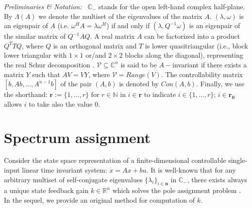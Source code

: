 \documentclass[conference]{IEEEtran}
\newcommand{\msv}{\mathcal{V}}
\newcommand{\numn}{\boldsymbol{n}}
\newcommand{\numr}{\boldsymbol{r}}
\newcommand{\kont}{\mathit{Con}}
\newcommand{\numro}{\boldsymbol{r_0}}
\begin{document}
\emph{Preliminaries \& Notation:~} $\mathbb{C}_{-}$ stands for the open
left-hand complex half-plane. By $\varLambda(A)$ we denote the
multiset of the eigenvalues of the matrix $A$. $(\lambda,\omega)$ is an eigenpair of $A$
(i.e. $\omega^HA=\lambda\omega^H$) if and only if $(\lambda,Q^{-1}\omega)$ is an
eigenpair of the similar matrix of $Q^{-1}A Q$. A real matrix $A$ can be
factorized into a product $Q^T T Q$, where $Q$ is an orthogonal matrix
and $T$ is lower quasitriangular (i.e., block lower triangular with
$1\times 1$ or/and $2\times 2$ blocks along the diagonal), representing the real
Schur decomposition \cite{qref:matrix-analysis-HJ-vol1}.
$\msv\subseteq\mathbb{C}^n$ is said to be $A-$invariant if
there exists a matrix $Y$ such that $AV=VY$, where
$\msv=\textit{Range}(V)$.  The controllability
matrix $[b,Ab,\ldots, A^{n-1}b]$ of the pair $(A,b)$ is denoted by $\kont(A,b)$.
Finally, we use the shorthand:
$\numr:=\{1,\ldots,r\}$ for $r\in\mathbb{N}$ in $i\in\numr$ to indicate
$i\in\{1,\ldots,r\}$; $i\in\numro$ allows $i$ to take also
the value $0$.
















\vspace{-2pt}
\section{Spectrum assignment}
\label{sec:Eigenvalue assignment}


Consider the state space representation of a finite-dimensional controllable  single-input linear time invariant  system:
$\dot{x}= Ax+bu$. It is well-known that for any arbitrary multiset  of
{self-conjugate} eigenvalues  $\{\lambda_i\}_{i\in\numn}$ in
$\mathbb{C}_-$, there exists always a unique state feedback gain $k
\in \mathbb{R}^n$ which solves the pole assignment problem \cite{Kailat80}. In the sequel, we provide an original method for computation of $k$.
\end{document}
